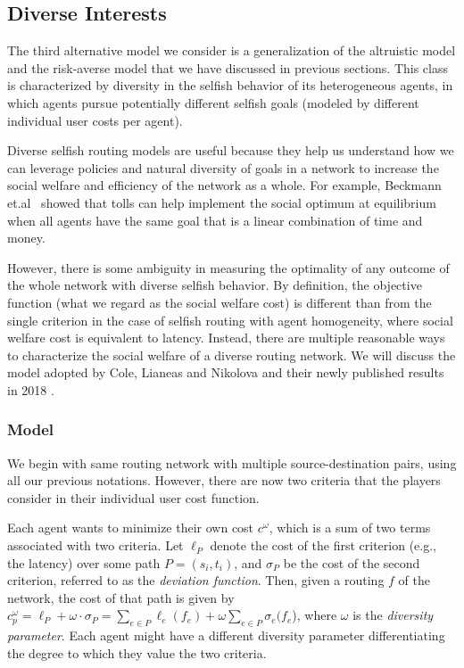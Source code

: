 \subsection{Diverse Interests}\label{sec:diversity}

The third alternative model we consider is a generalization of the altruistic model and the risk-averse model that we have discussed in previous sections. This class is characterized by diversity in the selfish behavior of its heterogeneous agents, in which agents pursue potentially different selfish goals (modeled by different individual user costs per agent).%

Diverse selfish routing models are useful because they help us understand how we can leverage policies and natural diversity of goals in a network to increase the social welfare and efficiency of the network as a whole. For example, Beckmann et.al~\cite{beckmann1956studies} showed that tolls can help implement the social optimum at equilibrium when all agents have the same goal that is a linear combination of time and money.

However, there is some ambiguity in measuring the optimality of any outcome of the whole network with diverse selfish behavior. By definition, the objective function (what we regard as the social welfare cost) is different than from the single criterion in the case of selfish routing with agent homogeneity, where social welfare cost is equivalent to latency. Instead, there are multiple reasonable ways to characterize the social welfare of a diverse routing network. We will discuss the model adopted by Cole, Lianeas and Nikolova and their newly published results in 2018 \cite{ijcai2018-24}.

\subsubsection{Model}

We begin with same routing network with multiple source-destination pairs, using all our previous notations. However, there are now two criteria that the players consider in their individual user cost function.

Each agent wants to minimize their own cost $c^\omega$, which is a sum of two terms associated with two criteria. Let $\ell_P$ denote the cost of the first criterion (e.g., the latency) over some path $P=(s_i, t_i)$, and $\sigma_P$ be the cost of the second criterion, referred to as the {\it deviation function}. Then, given a routing $f$ of the network, the cost of that path is given by $c^\omega_p = \ell_P+\omega\cdot \sigma_P=\sum_{e\in P} \ell_e(f_e)+ \omega\sum_{e\in P}\sigma_e(f_e$), where $\omega$ is the {\it diversity parameter}. Each agent might have a different diversity parameter differentiating the degree to which they value the two criteria.

